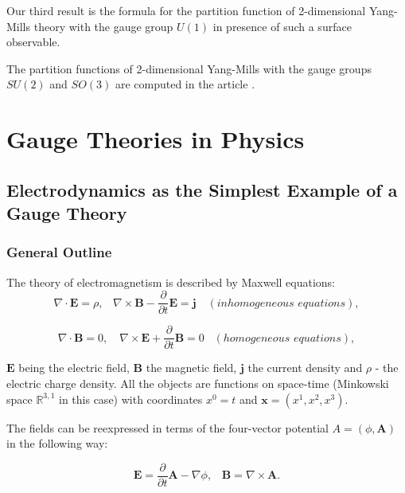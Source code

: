 \documentclass[11pt]{report}
\theoremstyle{plain}
\theoremstyle{definition}
\theoremstyle{remark}
\theoremstyle{remark}
\numberwithin{equation}{section}
\begin{document}
Our third result is the formula for the partition function of 2-dimensional Yang-Mills theory with the gauge group $U(1)$ in presence of such a surface observable. 

The partition functions of 2-dimensional Yang-Mills with the gauge groups $SU(2)$ and $SO(3)$ are computed in the article \cite{ACM}.


\chapter{Gauge Theories in Physics}

\section{Electrodynamics as the Simplest Example of a Gauge Theory}
\subsection{General Outline}

The theory of electromagnetism is described by Maxwell equations:
%
\begin{equation}\label{Max1}
\nabla \cdotp \mathbf{E} = \rho , \, \, \, \, \,   \nabla \times \mathbf{B} - \frac{\partial}{\partial t} \mathbf{E} = \mathbf{j} \,\, \, \, \, \, (inhomogeneous \, \, equations),
\end{equation}


\begin{equation}\label{Max2}
\nabla \cdotp \mathbf{B} = 0, \, \, \, \, \, \,  \nabla \times \mathbf{E} + \frac{\partial}{\partial t} \mathbf{B} = 0 \,\, \, \, \, (homogeneous\, \, equations),
\end{equation}
%


$\mathbf{E}$ being the electric field, $\mathbf{B}$ the magnetic field,  $\mathbf{j}$ the current density and $\rho$ - the electric charge density. All the objects are functions on space-time (Minkowski space $\mathbb{R}^{3,1}$ in this case) with coordinates $x^0 = t$ and $\mathbf{x} = (x^1,x^2,x^3)$.

The fields can be reexpressed in terms of the four-vector potential $A = (\phi, \mathbf{A})$ in the following way:

% 
\begin{equation}
\mathbf{E} = \frac{\partial}{\partial t}\mathbf{A} - \nabla \phi, \, \, \, \, \,   
\mathbf{B} = \nabla \times \mathbf{A}.
\end{equation}
%
\end{document}
